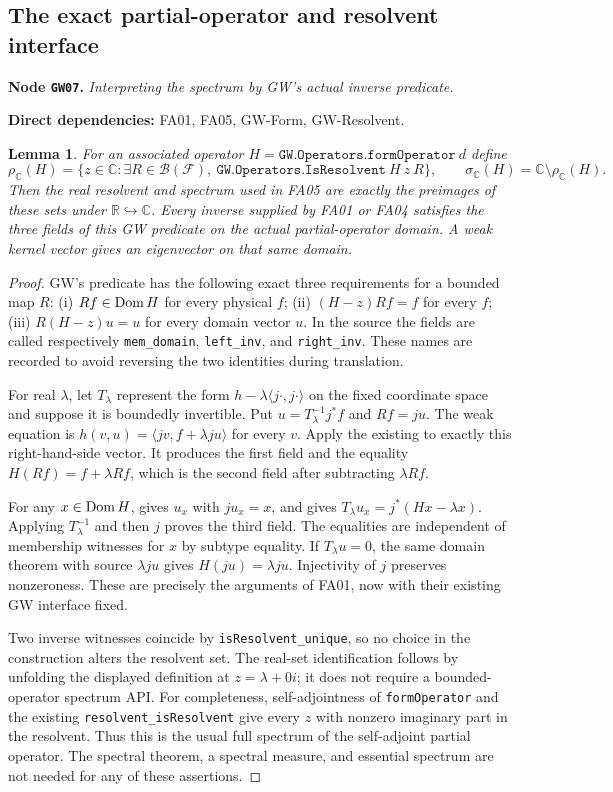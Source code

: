 \documentclass[11pt,a4paper]{article}
\newtheorem{lemma}[theorem]{Lemma}
\theoremstyle{remark}\newtheorem{remark}[theorem]{Remark}
\newcommand{\R}{\mathbb R}\newcommand{\C}{\mathbb C}\newcommand{\N}{\mathbb N}
\newcommand{\F}{\mathcal F}\newcommand{\Q}{\mathcal Q}\newcommand{\HH}{\mathcal H}
\newcommand{\node}[3]{\par\Needspace{6\baselineskip}\smallskip\hypertarget{node:#1}{}\label{nodepage:#1}\noindent\textbf{Node \texttt{#1}.} \textit{#2.}\par\noindent\textbf{Direct dependencies:} #3.\par}
\begin{document}
\subsection{The exact partial-operator and resolvent interface}
\node{GW07}{Interpreting the spectrum by GW's actual inverse predicate}{FA01, FA05, GW-Form, GW-Resolvent}
\begin{lemma}\label{lem:gwresolvent}
For an associated operator $H=\texttt{GW.Operators.formOperator}\ d$ define
\[
 \rho_{\C}(H)=\{z\in\C:\exists R\in\mathcal B(\F),\
       \texttt{GW.Operators.IsResolvent}\ H\ z\ R\},\qquad
 \sigma_{\C}(H)=\C\setminus\rho_{\C}(H).
\]
Then the real resolvent and spectrum used in FA05 are exactly the preimages of these sets under $\R\hookrightarrow\C$. Every inverse supplied by FA01 or FA04 satisfies the three fields of this GW predicate on the \emph{actual} partial-operator domain. A weak kernel vector gives an eigenvector on that same domain.
\end{lemma}
\begin{proof}
GW's predicate has the following exact three requirements for a bounded map $R$: (i) $Rf\in\operatorname{Dom} H$ for every physical $f$; (ii) $(H-z)Rf=f$ for every $f$; (iii) $R(H-z)u=u$ for every domain vector $u$. In the source the fields are called respectively \texttt{mem\_domain}, \texttt{left\_inv}, and \texttt{right\_inv}. These names are recorded to avoid reversing the two identities during translation.

For real $\lambda$, let $T_\lambda$ represent the form $h-\lambda\langle j\cdot,j\cdot\rangle$ on the fixed coordinate space and suppose it is boundedly invertible. Put $u=T_\lambda^{-1}j^*f$ and $Rf=ju$. The weak equation is
$h(v,u)=\langle jv,f+\lambda ju\rangle$ for every $v$.
Apply the existing  to exactly this right-hand-side vector. It produces the first field and the equality $H(Rf)=f+\lambda Rf$, which is the second field after subtracting $\lambda Rf$.

For any $x\in\operatorname{Dom} H$,  gives $u_x$ with $ju_x=x$, and  gives
$T_\lambda u_x=j^*(Hx-\lambda x)$.
Applying $T_\lambda^{-1}$ and then $j$ proves the third field. The equalities are independent of membership witnesses for $x$ by subtype equality. If $T_\lambda u=0$, the same domain theorem with source $\lambda ju$ gives $H(ju)=\lambda ju$. Injectivity of $j$ preserves nonzeroness. These are precisely the arguments of FA01, now with their existing GW interface fixed.

Two inverse witnesses coincide by \texttt{isResolvent\_unique}, so no choice in the construction alters the resolvent set. The real-set identification follows by unfolding the displayed definition at $z=\lambda+0i$; it does not require a bounded-operator spectrum API. For completeness, self-adjointness of \texttt{formOperator} and the existing \texttt{resolvent\_isResolvent} give every $z$ with nonzero imaginary part in the resolvent. Thus this is the usual full spectrum of the self-adjoint partial operator. The spectral theorem, a spectral measure, and essential spectrum are not needed for any of these assertions.
\end{proof}
\end{document}
